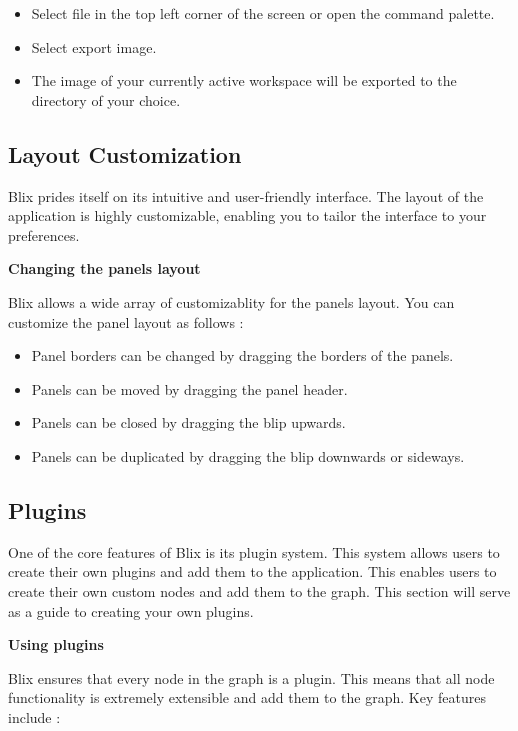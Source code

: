 \documentclass[11pt,a4paper]{article}
\begin{document}
\begin{itemize}
  \item[\textbullet] Select file in the top left corner of the screen or open the command palette.
  \item[\textbullet] Select export image.
  \item[\textbullet] The image of your currently active workspace will be exported to the directory of your choice.
\end{itemize}

\subsection*{Layout Customization}

Blix prides itself on its intuitive and user-friendly interface. The layout of the application is highly customizable, enabling you to tailor the interface to your preferences.

\textbf{Changing the panels layout}

Blix allows a wide array of customizablity for the panels layout. You can customize the panel layout as follows :

\begin{itemize}
  \item[\textbullet] Panel borders can be changed by dragging the borders of the panels.
  \item[\textbullet] Panels can be moved by dragging the panel header.
  \item[\textbullet] Panels can be closed by dragging the blip upwards.
  \item[\textbullet] Panels can be duplicated by dragging the blip downwards or sideways.
\end{itemize}


\subsection*{Plugins}

One of the core features of Blix is its plugin system. This system allows users to create their own plugins and add them to the application. This enables users to create their own custom nodes and 
add them to the graph. This section will serve as a guide to creating your own plugins.

\textbf{Using plugins}

Blix ensures that every node in the graph is a plugin. This means that all node functionality is extremely extensible and add them to the graph. Key features include : 
\end{document}
